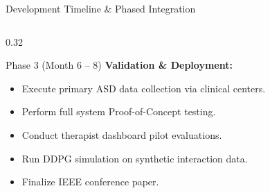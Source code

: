 \documentclass[aspectratio=169, 11pt, xcolor=table]{beamer}
\begin{document}
\begin{frame}{Development Timeline \& Phased Integration}
\begin{columns}[T]
        \begin{column}{0.32\textwidth}
            \begin{block}{\scriptsize Phase 3 (Month 6 -- 8)}
                \scriptsize
                \textbf{Validation \& Deployment:}
                \begin{itemize}
                    \item Execute primary ASD data collection via clinical centers.
                    \item Perform full system Proof-of-Concept testing.
                    \item Conduct therapist dashboard pilot evaluations.
                    \item Run DDPG simulation on synthetic interaction data.
                    \item Finalize IEEE conference paper.
                \end{itemize}
            \end{block}
        \end{column}
    \end{columns}
\end{frame}
\end{document}
